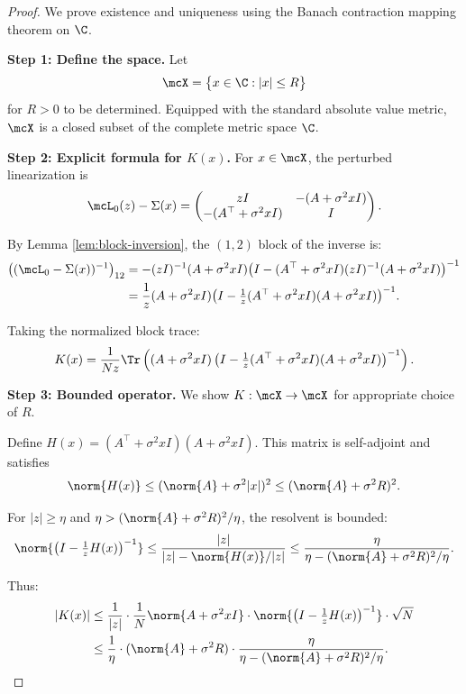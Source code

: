 \begin{proof}
We prove existence and uniqueness using the Banach contraction mapping theorem on $\C$.

\textbf{Step 1: Define the space.}
Let
\[
\mcX = \bigl\{x \in \C : |x| \leq R\bigr\}
\]
for $R > 0$ to be determined. Equipped with the standard absolute value metric, $\mcX$ is a closed subset of the complete metric space $\C$.

\textbf{Step 2: Explicit formula for $K(x)$.}
For $x \in \mcX$, the perturbed linearization is
\[
\mcL_0(z) - \Sigma(x)
= \begin{pmatrix} zI & -(A + \sigma^2 x I) \\ -(A^\top + \sigma^2 x I) & I \end{pmatrix}.
\]

By Lemma \ref{lem:block-inversion}, the $(1,2)$ block of the inverse is:
\begin{align}
\bigl((\mcL_0 - \Sigma(x))^{-1}\bigr)_{12}
&= -(zI)^{-1}(A + \sigma^2 x I) \bigl(I - (A^\top + \sigma^2 x I)(zI)^{-1}(A + \sigma^2 x I)\bigr)^{-1} \notag\\
&= \frac{1}{z}(A + \sigma^2 x I) \bigl(I - \tfrac{1}{z}(A^\top + \sigma^2 x I)(A + \sigma^2 x I)\bigr)^{-1}. \label{eq:K-explicit}
\end{align}

Taking the normalized block trace:
\begin{equation}\label{eq:K-formula-appendix}
K(x) = \frac{1}{Nz}\Tr\left((A + \sigma^2 x I)\left(I - \tfrac{1}{z}(A^\top + \sigma^2 x I)(A + \sigma^2 x I)\right)^{-1}\right).
\end{equation}

\textbf{Step 3: Bounded operator.}
We show $K: \mcX \to \mcX$ for appropriate choice of $R$.

Define $H(x) = (A^\top + \sigma^2 x I)(A + \sigma^2 x I)$. This matrix is self-adjoint and satisfies
\[
\norm{H(x)} \leq (\norm{A} + \sigma^2 |x|)^2 \leq (\norm{A} + \sigma^2 R)^2.
\]

For $|z| \geq \eta$ and $\eta > (\norm{A} + \sigma^2 R)^2/\eta$, the resolvent is bounded:
\[
\norm{\bigl(I - \tfrac{1}{z}H(x)\bigr)^{-1}} \leq \frac{|z|}{|z| - \norm{H(x)}/|z|} \leq \frac{\eta}{\eta - (\norm{A} + \sigma^2 R)^2/\eta}.
\]

Thus:
\begin{align}
|K(x)|
&\leq \frac{1}{|z|} \cdot \frac{1}{N}\norm{A + \sigma^2 x I} \cdot \norm{\bigl(I - \tfrac{1}{z}H(x)\bigr)^{-1}} \cdot \sqrt{N} \notag\\
&\leq \frac{1}{\eta} \cdot (\norm{A} + \sigma^2 R) \cdot \frac{\eta}{\eta - (\norm{A} + \sigma^2 R)^2/\eta}. \label{eq:K-bound}
\end{align}


\end{proof}
